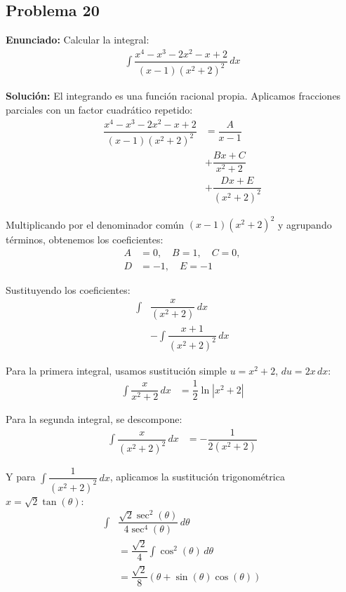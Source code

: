 \subsection*{Problema 20}

\textbf{Enunciado:}
Calcular la integral:
\begin{align*}
\int \dfrac{x^4 - x^3 - 2x^2 - x + 2}{(x - 1)(x^2 + 2)^2} \, dx
\end{align*}

\textbf{Solución:}
El integrando es una función racional propia. 
Aplicamos fracciones parciales con un 
factor cuadrático repetido:
\begin{align*}
\dfrac{x^4 - x^3 - 2x^2 - x + 2}{(x - 1)(x^2 + 2)^2} &= 
\dfrac{A}{x - 1} \\
&+ \dfrac{Bx + C}{x^2 + 2} \\
&+ \dfrac{Dx + E}{(x^2 + 2)^2}
\end{align*}

Multiplicando por el denominador común 
$(x - 1)(x^2 + 2)^2$ y agrupando términos, 
obtenemos los coeficientes:
\begin{align*}
A &= 0, \quad B = 1, \quad C = 0, \\
D &= -1, \quad E = -1
\end{align*}

Sustituyendo los coeficientes:
\begin{align*}
\int &\dfrac{x}{(x^2 + 2)} \, dx \\
&- \int \dfrac{x + 1}{(x^2 + 2)^2} \, dx
\end{align*}

Para la primera integral, usamos sustitución 
simple $u = x^2 + 2$, $du = 2x \, dx$:
\begin{align*}
\int \dfrac{x}{x^2 + 2} \, dx &= \dfrac{1}{2}\ln|x^2 + 2|
\end{align*}

Para la segunda integral, se descompone:
\begin{align*}
\int \dfrac{x}{(x^2 + 2)^2} \, dx &= -\dfrac{1}{2(x^2 + 2)}
\end{align*}

Y para $\int \dfrac{1}{(x^2 + 2)^2} \, dx$, 
aplicamos la sustitución trigonométrica 
$x = \sqrt{2}\tan(\theta)$:
\begin{align*}
\int &\dfrac{\sqrt{2}\sec^2(\theta)}{4\sec^4(\theta)} \, d\theta \\
&= \dfrac{\sqrt{2}}{4} \int \cos^2(\theta) \, d\theta \\
&= \dfrac{\sqrt{2}}{8}(\theta + \sin(\theta)\cos(\theta))
\end{align*}

